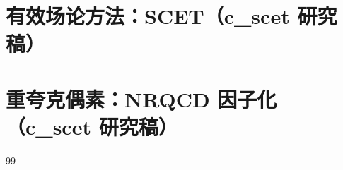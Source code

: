 

\tableofcontents
\chapter{有效场论方法：SCET（c\_scet 研究稿）}



\chapter{重夸克偶素：NRQCD 因子化（c\_scet 研究稿）}


\renewcommand{\bibname}{参考文献（c\_scet 新增条目）}
\begin{thebibliography}{99}

\end{thebibliography}

